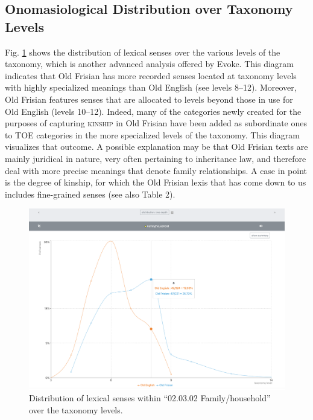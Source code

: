 \subsection{Onomasiological Distribution over Taxonomy Levels}
Fig. \ref{fig:Stolk2021b:Fig7} shows the distribution of lexical senses over the various levels of the taxonomy, which is another advanced analysis offered by Evoke.  This diagram indicates that Old Frisian has more recorded senses located at taxonomy levels with highly specialized meanings than Old English (see levels 8–12). Moreover, Old Frisian features senses that are allocated to levels beyond those in use for Old English (levels 10–12). Indeed, many of the categories newly created for the purposes of capturing \textsc{kinship} in Old Frisian have been added as subordinate ones to TOE categories in the more specialized levels of the taxonomy. This diagram visualizes that outcome. A possible explanation may be that Old Frisian texts are mainly juridical in nature, very often pertaining to inheritance law, and therefore deal with more precise meanings that denote family relationships. A case in point is the degree of kinship, for which the Old Frisian lexis that has come down to us includes fine-grained senses (see also Table 2). 


\begin{figure}[htbp]
	\includegraphics[width=\textwidth]{Stolk2021b/fig/Fig7.png}
	\caption[]{\label{fig:Stolk2021b:Fig7} Distribution of lexical senses within “02.03.02 Family/household” over the taxonomy levels.}
\end{figure}


